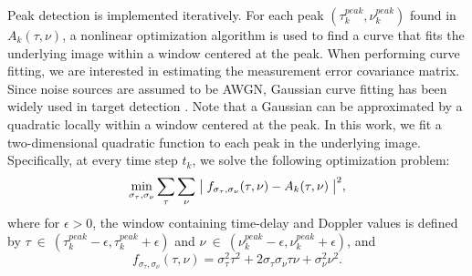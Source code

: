 \documentclass[times]{asjcauth}
\begin{document}
Peak detection is implemented iteratively. For each peak $\left(\tau_{k}^{peak},\nu_{k}^{peak}\right)$ found in $A_{k}(\tau,\nu)$, a nonlinear optimization algorithm is used to find a curve that fits the underlying image within a window centered at the peak. When performing curve fitting, we are interested in estimating the measurement error covariance matrix. Since noise sources are assumed to be AWGN, Gaussian curve fitting has been widely used in target detection \cite{gauss}. Note that a Gaussian can be approximated by a quadratic locally within a window centered at the peak. In this work, we fit a two-dimensional quadratic function to each peak in the underlying image. Specifically, at every time step $t_{k}$, we solve the following optimization problem:
\begin{equation*}
\min_{\sigma_{\tau},\sigma_{\nu}}\sum_{\tau}\sum_{\nu}\bigm\vert f_{\sigma_\tau,\sigma_\nu}(\tau,\nu)-A_{k}(\tau,\nu)\bigm\vert^{2},
\end{equation*}
\noindent where for $\epsilon > 0$, the window containing time-delay and Doppler values is defined by $\tau~\in~\left(\tau_{k}^{peak}-\epsilon,\tau_{k}^{peak}+\epsilon\right)$ and $\nu~\in~\left(\nu_{k}^{peak}-\epsilon,\nu_{k}^{peak}+\epsilon\right)$, and
\begin{equation*}
f_{\sigma_\tau,\sigma_\nu}(\tau,\nu) = \sigma_{\tau}^{2}\tau^{2} + 2\sigma_{\tau}\sigma_{\nu}\tau\nu + \sigma_{\nu}^{2}\nu^{2}.
\end{equation*}
\end{document}
